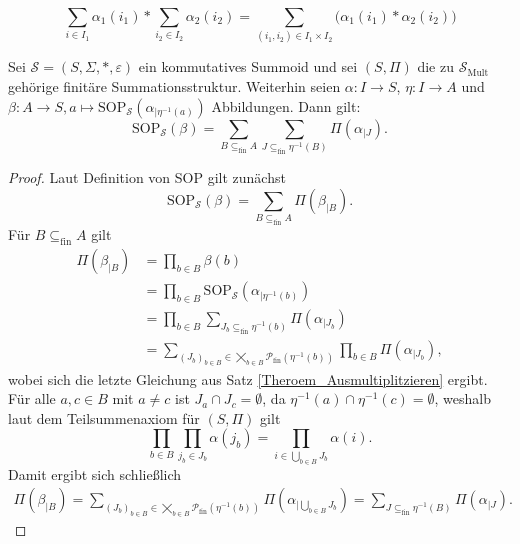 \documentclass{article}
\begin{document}
\begin{example}
  \begin{equation*}
    \sum_{i \in I_1}\alpha_1(i_1) \ast \sum_{i_2 \in I_2}\alpha_2(i_2) = \sum_{(i_1, i_2) \in I_1 \times I_2} \Big( \alpha_1(i_1) \ast \alpha_2(i_2) \Big)
  \end{equation*}
\end{example}

\begin{lemma}\label{Lemma_SOPTeilsumme}
  Sei $\mathcal{S} = (S, \Sigma, \ast, \varepsilon)$ ein kommutatives Summoid und
  sei $(S, \Pi)$ die zu $\mathcal{S}_\text{Mult}$ gehörige finitäre Summationsstruktur.
  Weiterhin seien $\alpha \colon I \to S$, $\eta \colon I \to A$ und $\beta \colon A \to S, a \mapsto \text{SOP}_\mathcal{S}(\alpha_{\mid \eta^{-1}(a)})$ Abbildungen.
  Dann gilt:
  \begin{equation*}
    \text{SOP}_\mathcal{S}(\beta) = \sum_{B \subseteq_\text{fin} A}\sum_{J \subseteq_\text{fin} \eta^{-1}(B)}\Pi(\alpha_{\mid J}).
  \end{equation*}
\end{lemma}
\begin{proof}
  Laut Definition von SOP gilt zunächst
  \begin{equation*}
    \text{SOP}_\mathcal{S}(\beta) = \sum_{B \subseteq_\text{fin} A}\Pi(\beta_{\mid B}).
  \end{equation*}
  Für $B \subseteq_\text{fin} A$ gilt
  \begin{align*}
    \Pi(\beta_{\mid B}) 
    &= \prod_{b \in B}\beta(b) \\
    &= \prod_{b \in B}\text{SOP}_\mathcal{S}(\alpha_{\mid \eta^{-1}(b)}) \\
    &= \prod_{b \in B}\sum_{J_b \subseteq_\text{fin}\eta^{-1}(b)}\Pi(\alpha_{\mid J_b}) \\
    &= \sum_{(J_b)_{b \in B} \in \bigtimes_{b \in B}\mathcal{P}_\text{fin}(\eta^{-1}(b))}\prod_{b \in B}\Pi(\alpha_{\mid J_b}),
  \end{align*}
  wobei sich die letzte Gleichung aus Satz \ref {Theroem_Ausmultiplitzieren} ergibt.
  Für alle $a, c \in B$ mit $a \neq c$ ist $J_a \cap J_c = \emptyset$, 
  da $\eta^{-1}(a) \cap \eta^{-1}(c) = \emptyset$,
  weshalb laut dem Teilsummenaxiom für $(S, \Pi)$ gilt
  \begin{equation*}
    \prod_{b \in B}\prod_{j_b \in J_b}\alpha(j_b) = \prod_{i \in \bigcup_{b \in B}J_b}\alpha(i).
  \end{equation*}
  Damit ergibt sich schließlich
  \begin{align*}
    \Pi(\beta_{\mid B}) 
    = \sum_{(J_b)_{b \in B} \in \bigtimes_{b \in B}\mathcal{P}_\text{fin}(\eta^{-1}(b))}\Pi(\alpha_{\mid \bigcup_{b \in B}J_b}) 
    = \sum_{J \subseteq_\text{fin}\eta^{-1}(B)}\Pi(\alpha_{\mid J}). 
  \end{align*}
\end{proof}
\end{document}
